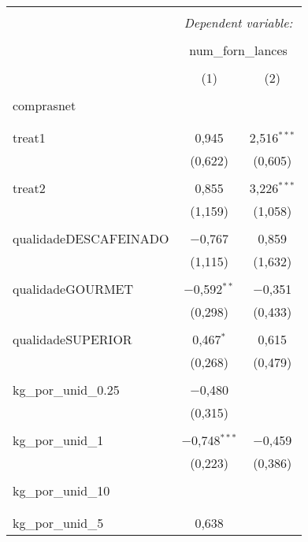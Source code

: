
\begin{table}[!htbp] \centering 
  \caption{} 
  \label{} 
\begin{tabular}{@{\extracolsep{5pt}}lcc} 
\\[-1.8ex]\hline 
\hline \\[-1.8ex] 
 & \multicolumn{2}{c}{\textit{Dependent variable:}} \\ 
\cline{2-3} 
\\[-1.8ex] & \multicolumn{2}{c}{num\_forn\_lances} \\ 
\\[-1.8ex] & (1) & (2)\\ 
\hline \\[-1.8ex] 
 comprasnet &  &  \\ 
  &  &  \\ 
  & & \\ 
 treat1 & 0,945 & 2,516$^{***}$ \\ 
  & (0,622) & (0,605) \\ 
  & & \\ 
 treat2 & 0,855 & 3,226$^{***}$ \\ 
  & (1,159) & (1,058) \\ 
  & & \\ 
 qualidadeDESCAFEINADO & $-$0,767 & 0,859 \\ 
  & (1,115) & (1,632) \\ 
  & & \\ 
 qualidadeGOURMET & $-$0,592$^{**}$ & $-$0,351 \\ 
  & (0,298) & (0,433) \\ 
  & & \\ 
 qualidadeSUPERIOR & 0,467$^{*}$ & 0,615 \\ 
  & (0,268) & (0,479) \\ 
  & & \\ 
 kg\_por\_unid\_0.25 & $-$0,480 &  \\ 
  & (0,315) &  \\ 
  & & \\ 
 kg\_por\_unid\_1 & $-$0,748$^{***}$ & $-$0,459 \\ 
  & (0,223) & (0,386) \\ 
  & & \\ 
 kg\_por\_unid\_10 &  &  \\ 
  &  &  \\ 
  & & \\ 
 kg\_por\_unid\_5 & 0,638 &  \\ 

\end{tabular}
\end{table}
